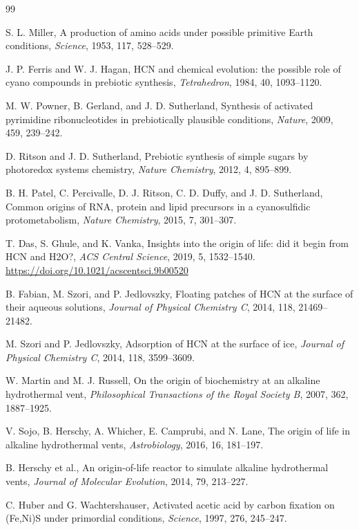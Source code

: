 \documentclass[11pt]{article}
\begin{document}
\begin{thebibliography}{99}

S. L. Miller,
A production of amino acids under possible primitive Earth conditions,
\emph{Science}, 1953, 117, 528--529.

J. P. Ferris and W. J. Hagan,
HCN and chemical evolution: the possible role of cyano compounds in prebiotic synthesis,
\emph{Tetrahedron}, 1984, 40, 1093--1120.

M. W. Powner, B. Gerland, and J. D. Sutherland,
Synthesis of activated pyrimidine ribonucleotides in prebiotically plausible conditions,
\emph{Nature}, 2009, 459, 239--242.

D. Ritson and J. D. Sutherland,
Prebiotic synthesis of simple sugars by photoredox systems chemistry,
\emph{Nature Chemistry}, 2012, 4, 895--899.

B. H. Patel, C. Percivalle, D. J. Ritson, C. D. Duffy, and J. D. Sutherland,
Common origins of RNA, protein and lipid precursors in a cyanosulfidic protometabolism,
\emph{Nature Chemistry}, 2015, 7, 301--307.

T. Das, S. Ghule, and K. Vanka,
Insights into the origin of life: did it begin from HCN and H2O?,
\emph{ACS Central Science}, 2019, 5, 1532--1540.
\url{https://doi.org/10.1021/acscentsci.9b00520}

B. Fabian, M. Szori, and P. Jedlovszky,
Floating patches of HCN at the surface of their aqueous solutions,
\emph{Journal of Physical Chemistry C}, 2014, 118, 21469--21482.

M. Szori and P. Jedlovszky,
Adsorption of HCN at the surface of ice,
\emph{Journal of Physical Chemistry C}, 2014, 118, 3599--3609.

W. Martin and M. J. Russell,
On the origin of biochemistry at an alkaline hydrothermal vent,
\emph{Philosophical Transactions of the Royal Society B}, 2007, 362, 1887--1925.

V. Sojo, B. Herschy, A. Whicher, E. Camprubi, and N. Lane,
The origin of life in alkaline hydrothermal vents,
\emph{Astrobiology}, 2016, 16, 181--197.

B. Herschy et al.,
An origin-of-life reactor to simulate alkaline hydrothermal vents,
\emph{Journal of Molecular Evolution}, 2014, 79, 213--227.

C. Huber and G. Wachtershauser,
Activated acetic acid by carbon fixation on (Fe,Ni)S under primordial conditions,
\emph{Science}, 1997, 276, 245--247.


\end{thebibliography}
\end{document}
